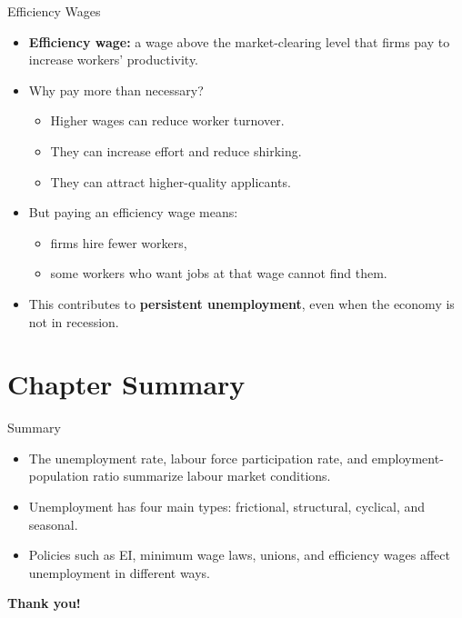 \documentclass[aspectratio=169]{beamer}
\begin{document}
\begin{frame}{Efficiency Wages}
\transfade
\begin{itemize}
  \item \textbf{Efficiency wage:} a wage above the market-clearing level that firms pay to increase workers’ productivity.
  \item Why pay more than necessary?
  \begin{itemize}
    \item Higher wages can reduce worker turnover.
    \item They can increase effort and reduce shirking.
    \item They can attract higher-quality applicants.
  \end{itemize}
  \item But paying an efficiency wage means:
  \begin{itemize}
    \item firms hire fewer workers,
    \item some workers who want jobs at that wage cannot find them.
  \end{itemize}
  \item This contributes to \textbf{persistent unemployment}, even when the economy is not in recession.
\end{itemize}
\end{frame}


\section*{Chapter Summary}

\begin{frame}{Summary}
\transfade
\begin{itemize}
  \item The unemployment rate, labour force participation rate, and employment-population ratio summarize labour market conditions.
  \item Unemployment has four main types: frictional, structural, cyclical, and seasonal.
  \item Policies such as EI, minimum wage laws, unions, and efficiency wages affect unemployment in different ways.
 
\end{itemize}
\end{frame}

\begin{frame}
\centering
\Huge \textbf{Thank you!}
\end{frame}
\end{document}
